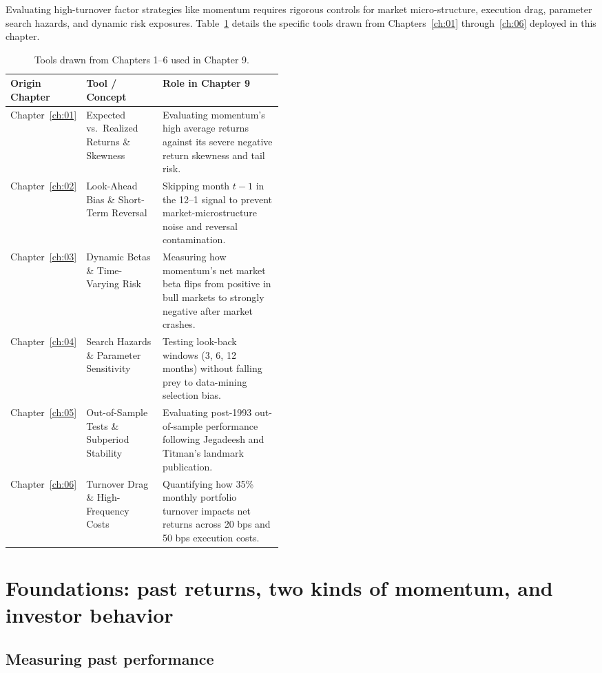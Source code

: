Evaluating high-turnover factor strategies like momentum requires rigorous controls for market micro-structure, execution drag, parameter search hazards, and dynamic risk exposures. Table~\ref{tab:09-tools} details the specific tools drawn from Chapters~\ref{ch:01} through~\ref{ch:06} deployed in this chapter.

\begin{table}[htbp]
\centering
\small
\caption{Tools drawn from Chapters 1--6 used in Chapter 9.}
\label{tab:09-tools}
\begin{tabularx}{0.95\linewidth}{@{}>{\raggedright\arraybackslash}p{0.18\linewidth}>{\raggedright\arraybackslash}p{0.28\linewidth}>{\raggedright\arraybackslash}X@{}}
\toprule
Origin Chapter & Tool / Concept & Role in Chapter 9 \\
\midrule
Chapter~\ref{ch:01} & Expected vs.\ Realized Returns \& Skewness & Evaluating momentum's high average returns against its severe negative return skewness and tail risk. \\
Chapter~\ref{ch:02} & Look-Ahead Bias \& Short-Term Reversal & Skipping month $t-1$ in the 12--1 signal to prevent market-microstructure noise and reversal contamination. \\
Chapter~\ref{ch:03} & Dynamic Betas \& Time-Varying Risk & Measuring how momentum's net market beta flips from positive in bull markets to strongly negative after market crashes. \\
Chapter~\ref{ch:04} & Search Hazards \& Parameter Sensitivity & Testing look-back windows (3, 6, 12 months) without falling prey to data-mining selection bias. \\
Chapter~\ref{ch:05} & Out-of-Sample Tests \& Subperiod Stability & Evaluating post-1993 out-of-sample performance following Jegadeesh and Titman's landmark publication. \\
Chapter~\ref{ch:06} & Turnover Drag \& High-Frequency Costs & Quantifying how 35\% monthly portfolio turnover impacts net returns across 20 bps and 50 bps execution costs. \\
\bottomrule
\end{tabularx}
\end{table}

\section{Foundations: past returns, two kinds of momentum, and investor behavior}
\label{sec:09-foundations}

\subsection{Measuring past performance}

